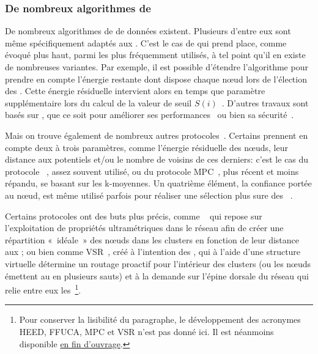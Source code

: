         \subsubsection{De nombreux algorithmes de }
De nombreux algorithmes de  de données existent.
Plusieurs d'entre eux sont même spécifiquement adaptés aux \rcsfs.
C'est le cas de \leach qui prend place, comme évoqué plus haut, parmi les plus fréquemment utilisés, à tel point qu'il en existe de nombreuses variantes.
Par exemple, il est possible d'étendre l'algorithme pour prendre en compte l'énergie restante dont dispose chaque nœud lors de l'élection des \CH.
Cette énergie résiduelle intervient alors en temps que paramètre supplémentaire lors du calcul de la valeur de seuil $S(i)$~\cite{HHT02}.
D'autres travaux sont basés sur \leach, que ce soit pour améliorer ses performances~\cite{RR13,CJ14} ou bien sa sécurité~\cite{OFVWBDL07}.

Mais on trouve également de nombreux autres protocoles~\cite{AY07,DQWH13}.
Certains prennent en compte deux à trois paramètres, comme l'énergie résiduelle des nœuds, leur distance aux \chs potentiels et/ou le nombre de voisins de ces derniers: c'est le cas du protocole \heed~\cite{YF04}, assez souvent utilisé, ou du protocole MPC~\cite{KTAA12}, plus récent et moins répandu, se basant sur les k-moyennes.
Un quatrième élément, la confiance portée au nœud, est même utilisé parfois pour réaliser une sélection plus sure des \CH~\cite{KMSL09}.

Certains protocoles ont des buts plus précis, comme \ffuca~\cite{FL11,FMMMI12} qui repose sur l'exploitation de propriétés ultramétriques dans le réseau afin de créer une répartition « idéale » des nœuds dans les clusters en fonction de leur distance aux \CH; ou bien comme VSR~\cite{TV08}, créé à l'intention des , qui à l'aide d'une structure virtuelle détermine un routage proactif pour l'intérieur des clusters (ou les nœuds émettent au \ch en plusieurs sauts) et à la demande sur l'épine dorsale du réseau qui relie entre eux les \CH\,\footnote{Pour conserver la lisibilité du paragraphe, le développement des acronymes HEED, FFUCA, MPC et VSR n'est pas donné ici. Il est néanmoins disponible \hyperref[acronymes]{en fin d'ouvrage}.}.


